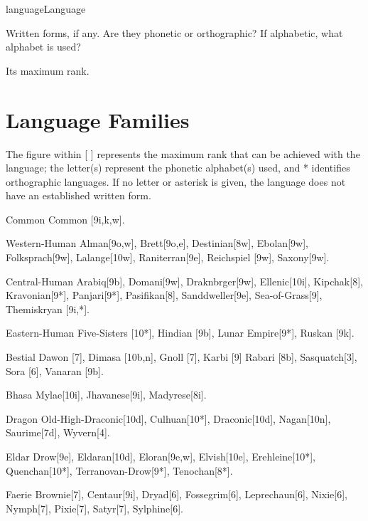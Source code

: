\begin{Skill}[2.1]{language}{Language}
\begin{Itemize}
\item Written forms, if any.  Are they phonetic or orthographic? If
  alphabetic, what alphabet is used?

\item Its maximum rank. 

\end{Itemize}

\section{Language Families}

The figure within [ ] represents the maximum rank that can be achieved
with the language; the letter(s) represent the phonetic alphabet(s)
used, and * identifies orthographic languages.  If no letter or
asterisk is given, the language does not have an established written
form.

\begin{Description}
  
\item[Common] Common [9i,k,w]. 

\item[Western-Human] Alman[9o,w], Brett[9o,e], Destinian[8w],
  Ebolan[9w], Folksprach[9w], Lalange[10w], Raniterran[9e], Reichspiel
  [9w], Saxony[9w].

\item[Central-Human] Arabiq[9b], Domani[9w], Draknbrger[9w],
  Ellenic[10i], Kipchak[8], Kravonian[9*], Panjari[9*], Pasifikan[8],
  Sanddweller[9e], Sea-of-Grass[9], Themiskryan [9i,*].

\item[Eastern-Human] Five-Sisters [10*], Hindian [9b], Lunar
  Empire[9*], Ruskan [9k].

\item[Bestial] Dawon [7], Dimasa [10b,n], Gnoll [7], Karbi [9] Rabari
  [8b], Sasquatch[3], Sora [6], Vanaran [9b].

\item[Bhasa] Mylae[10i], Jhavanese[9i], Madyrese[8i]. 

\item[Dragon] Old-High-Draconic[10d], Culhuan[10*], Draconic[10d],
  Nagan[10n], Saurime[7d], Wyvern[4].

\item[Eldar] Drow[9e], Eldaran[10d], Eloran[9e,w], Elvish[10e],
  Erehleine[10*], Quenchan[10*], Terranovan-Drow[9*], Tenochan[8*].

\item[Faerie] Brownie[7], Centaur[9i], Dryad[6], Fossegrim[6],
Leprechaun[6], Nixie[6], Nymph[7], Pixie[7], Satyr[7], Sylphine[6].


\end{Description}
\end{Skill}
